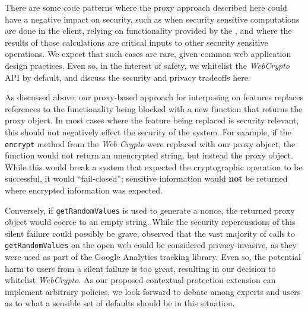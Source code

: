 There are some code patterns where the proxy approach described here could have
a negative impact on security, such as when security sensitive computations are
done in the client, relying on functionality provided by the \WAPI, and where the
results of those calculations are critical inputs to other security sensitive
operations.  We expect that such cases are rare, given common web application
design practices. Even so, in the interest of safety, we whitelist the
\emph{WebCrypto} API by default, and discuss the security
and privacy tradeoffs here.

As discussed above, our proxy-based approach for interposing on \WAPI features
replaces references to the functionality being blocked with a new function that
returns the proxy object.  In most cases where the feature being replaced is
security relevant, this should not negatively effect the security of the system.  For
example, if the \texttt{encrypt} method from the \emph{Web Crypto} were
replaced with our proxy object, the function would not return an unencrypted
string, but instead the proxy object.  While this would break a system that
expected the cryptographic operation to be successful, it would
``fail-closed''; sensitive information would \textbf{not} be returned where
encrypted information was expected.

Conversely, if \texttt{getRandomValues} is used to generate a nonce,  the
returned proxy object would coerce to an empty string. While the security
repercussions of this silent failure could possibly be grave,
\cite{snyder2016browser} observed that the vast majority of calls to
\texttt{getRandomValues} on the open web could be considered privacy-invasive,
as they were used as part of the Google Analytics tracking library. Even so,
the potential harm to users from a silent failure is too great, resulting in
our decision to whitelist \emph{WebCrypto}. As our proposed contextual
protection extension can implement arbitrary policies, we look forward to
debate among experts and users as to what a sensible set of defaults should be
in this situation.


